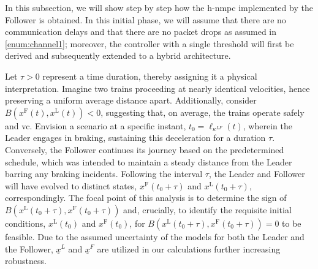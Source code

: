 In this subsection, we will show step by step how the \gls{h-nmpc} implemented by the Follower is obtained. In this initial phase, we will assume that there are no communication delays and that there are no packet drops as assumed in \ref{enum:channel1}; moreover, the controller with a single threshold will first be derived and subsequently extended to a hybrid architecture.

Let \(\tau > 0\) represent a time duration, thereby assigning it a physical interpretation. Imagine two trains proceeding at nearly identical velocities, hence preserving a uniform average distance apart. Additionally, consider \(B\left(x^\mathrm{F}\left(t\right), x^\mathrm{L}\left(t\right)\right) < 0\), suggesting that, on average, the trains operate safely and \gls{vc}. Envision a scenario at a specific instant, \(t_0=\ell_{\kappa^{LF}}(t)\), wherein the Leader engages in braking, sustaining this deceleration for a duration \(\tau\). Conversely, the Follower continues its journey based on the predetermined schedule, which was intended to maintain a steady distance from the Leader barring any braking incidents. Following the interval \(\tau\), the Leader and Follower will have evolved to distinct states, \(x^\mathrm{F}\left(t_0+\tau\right)\) and \(x^\mathrm{L}\left(t_0+\tau\right)\), correspondingly. The focal point of this analysis is to determine the sign of \(B\left(x^\mathrm{L}\left(t_0+\tau\right), x^\mathrm{F}\left(t_0+\tau\right)\right)\) and, crucially, to identify the requisite initial conditions, \(x^\mathrm{L}\left(t_0\right)\) and \(x^\mathrm{F}\left(t_0\right)\), for \(B\left(x^\mathrm{L}\left(t_0+\tau\right), x^\mathrm{F}\left(t_0+\tau\right)\right) = 0\) to be feasible. Due to the assumed uncertainty of the models for both the Leader and the Follower, \(\underline{x}^L\) and \(\underline{x}^F\) are utilized in our calculations further increasing robustness.

